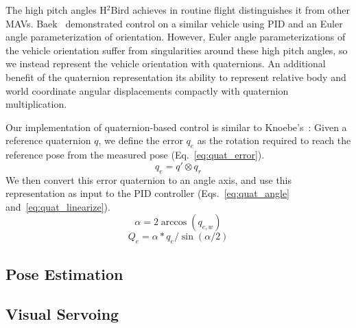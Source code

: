 \documentclass{aamas2013}
\begin{document}
The high pitch angles H$^2$Bird achieves in routine flight distinguishes it 
from other MAVs. Baek~\cite{baek:tracking} 
demonstrated control on a similar vehicle using PID and an Euler angle
parameterization of orientation. However, Euler angle parameterizations of the vehicle orientation 
suffer from singularities around these high pitch angles, so we instead 
represent the vehicle orientation with quaternions. An additional benefit of 
the quaternion representation its ability to represent relative body and 
world coordinate angular displacements compactly with quaternion 
multiplication.

Our implementation of quaternion-based control is similar to Knoebe's~\cite{knoebe:quatcontrol}:
Given a reference quaternion $q$, we define the error $q_e$ as the rotation 
required to reach the reference pose from the measured pose (Eq.~\ref{eq:quat_error}). 
\begin{equation}
\label{eq:quat_error}
q_e = q'\otimes q_r
\end{equation}
We then convert this error quaternion to an angle axis, and use this 
representation as input to the PID controller 
(Eqs.~\ref{eq:quat_angle} and~\ref{eq:quat_linearize}). 
\begin{equation}
\label{eq:quat_angle}
\alpha = 2\arccos(q_{e,w})
\end{equation}
\begin{equation}
\label{eq:quat_linearize}
Q_e = \alpha*q_e/\sin(\alpha /2)
\end{equation}

\subsection{Pose Estimation}

\subsection{Visual Servoing}
\end{document}
